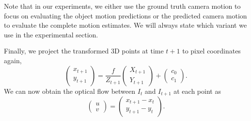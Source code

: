 Note that in our experiments, we either use the ground truth camera motion to focus
on evaluating the object motion predictions or the predicted camera motion to evaluate
the complete motion estimates. We will always state which variant we use in the experimental section.

Finally, we project the transformed 3D points at time $t+1$ to pixel coordinates again,
\begin{equation}
\begin{pmatrix}
x_{t+1} \\ y_{t+1}
\end{pmatrix}
=
\frac{f}{Z_{t+1}}
\begin{pmatrix}
X_{t+1} \\ Y_{t+1}
\end{pmatrix}
+
\begin{pmatrix}
c_0 \\ c_1
\end{pmatrix}.
\end{equation}
We can now obtain the optical flow between $I_t$ and $I_{t+1}$ at each point as
\begin{equation}
\begin{pmatrix}
u \\ v
\end{pmatrix}
=
\begin{pmatrix}
x_{t+1} - x_{t} \\ y_{t+1} - y_{t}
\end{pmatrix}.
\end{equation}
